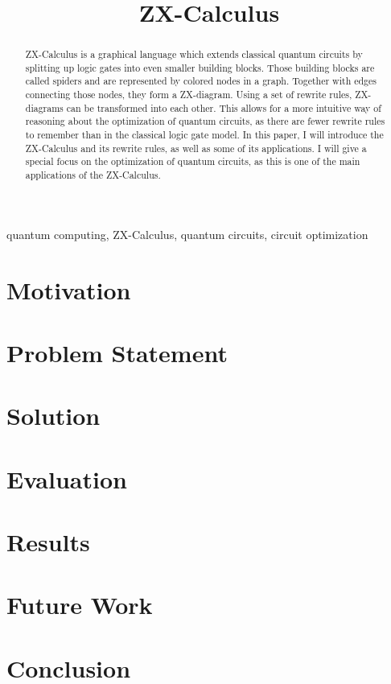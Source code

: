 \documentclass[conference]{IEEEtran}
\begin{document}


\tableofcontents

\title{ZX-Calculus}

\author{
}

\maketitle

\begin{abstract}
    ZX-Calculus is a graphical language which extends classical quantum circuits by splitting up logic gates into even smaller building blocks. Those building blocks are called spiders and are represented by colored nodes in a graph. Together with edges connecting those nodes, they form a ZX-diagram. Using a set of rewrite rules, ZX-diagrams can be transformed into each other. This allows for a more intuitive way of reasoning about the optimization of quantum circuits, as there are fewer rewrite rules to remember than in the classical logic gate model. In this paper, I will introduce the ZX-Calculus and its rewrite rules, as well as some of its applications. I will give a special focus on the optimization of quantum circuits, as this is one of the main applications of the ZX-Calculus.
\end{abstract}

\begin{IEEEkeywords}
    quantum computing, ZX-Calculus, quantum circuits, circuit optimization
\end{IEEEkeywords}







\section{Motivation}


\section{Problem Statement}

\section{Solution}

\section{Evaluation}

\section{Results}

\section{Future Work}

\section{Conclusion}





\end{document}
